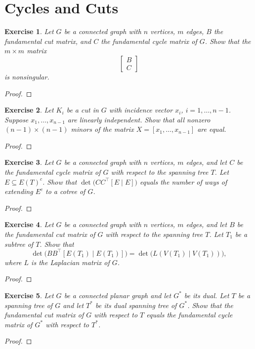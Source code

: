 \documentclass[11pt]{article}
\newtheorem{exercise}{Exercise}[section]
\theoremstyle{definition}
\begin{document}
\section{Cycles and Cuts}

\begin{exercise}
Let $G$ be a connected graph with $n$ vertices, $m$ edges, $B$ the fundamental cut matrix,
and $C$ the fundamental cycle matrix of $G$. Show that the $m\times m$ matrix
\[
\begin{bmatrix}B\\ C\end{bmatrix}
\]
is nonsingular.
\end{exercise}
\begin{proof}
\end{proof}

\begin{exercise}
Let $K_i$ be a cut in $G$ with incidence vector $x_i$, $i=1,\ldots,n-1$. Suppose
$x_1,\ldots,x_{n-1}$ are linearly independent. Show that all nonzero $(n-1)\times (n-1)$
minors of the matrix $X=[x_1,\ldots,x_{n-1}]$ are equal.
\end{exercise}
\begin{proof}
\end{proof}

\begin{exercise}
Let $G$ be a connected graph with $n$ vertices, $m$ edges, and let $C$ be the fundamental
cycle matrix of $G$ with respect to the spanning tree $T$. Let $E\subseteq E(T)^{c}$.
Show that $\det\!\big(CC^\top[E\mid E]\big)$ equals the number of ways of extending $E^{c}$
to a cotree of $G$.
\end{exercise}
\begin{proof}
\end{proof}

\begin{exercise}
Let $G$ be a connected graph with $n$ vertices, $m$ edges, and let $B$ be the fundamental
cut matrix of $G$ with respect to the spanning tree $T$. Let $T_1$ be a subtree of $T$.
Show that
\[
\det\!\big(BB^\top[E(T_1)\mid E(T_1)]\big)=\det\!\big(L(V(T_1)\mid V(T_1))\big),
\]
where $L$ is the Laplacian matrix of $G$.
\end{exercise}
\begin{proof}
\end{proof}

\begin{exercise}
Let $G$ be a connected planar graph and let $G^\ast$ be its dual. Let $T$ be a spanning tree
of $G$ and let $T^\ast$ be its dual spanning tree of $G^\ast$. Show that the fundamental
cut matrix of $G$ with respect to $T$ equals the fundamental cycle matrix of $G^\ast$
with respect to $T^\ast$.
\end{exercise}
\begin{proof}
\end{proof}
\end{document}
